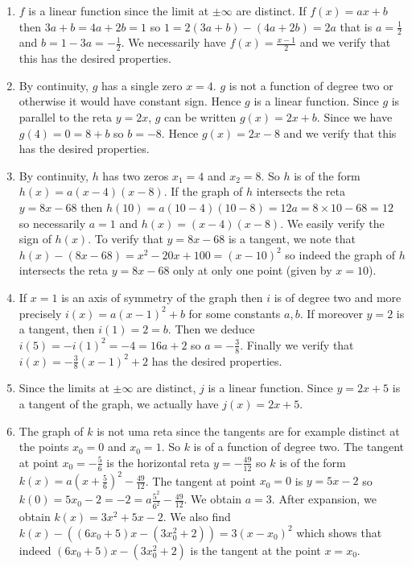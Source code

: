 \begin{enumerate}
\item $f$ is a linear function since the limit at $\pm\infty$ are distinct.
  If $f(x) = ax +b$ then $3a+b= 4a+2b = 1$
  so $1 = {2(3a+b)} - {(4a+2b)} = 2a$ that is $a = \frac{1}{2}$ and
  $b = 1 - 3a = -\frac{1}{2}$. We necessarily have $f(x) = \frac{x-1}{2}$
  and we verify that this has the desired properties.
\item By continuity, $g$ has a single zero $x = 4$. $g$ is not a function of
  degree two or otherwise it would have constant sign. Hence $g$ is a linear
  function. Since $g$ is parallel to the reta
  $y = 2x$, $g$ can be written $g(x) = 2x + b$. Since we have $g(4) = 0 =
  8 + b$ so $b = -8$. Hence $g(x) = 2x - 8$
  and we verify that this has the desired properties.
\item By continuity, $h$ has two zeros $x_1=4$ and $x_2=8$. So $h$ is of the
  form $h(x) = a {(x-4)} {(x-8)}$. If the graph of $h$
  intersects the reta $y = 8x - 68$
  then $h(10) = a {(10-4)} {(10-8)} = 12a = {8\times10-68} = 12$ so
  necessarily $a=1$ and $h(x) = {(x-4)} {(x-8)}$. We easily verify the sign
  of $h(x)$. To verify that $y = 8x - 68$ is a tangent, we note that
  $h(x) - {(8x - 68)} = x^2 - 20x +100 = {(x-10)}^2$ so indeed the graph
  of $h$ intersects the reta $y = 8x - 68$ only at only one point
  (given by $x=10$).
\item If $x = 1$ is an axis of symmetry of the graph then $i$ is of degree
  two and more precisely $i(x) = a {(x-1)}^2 + b$ for some constants $a,b$.
  If moreover $y = 2$ is a tangent, then $i(1) = 2 = b$.
  Then we deduce $i(5) = -{i(1)}^2 = -4 = 16a+2$ so $a = -\frac{3}{8}$.
  Finally we verify that $i(x) = -\frac{3}{8} {(x-1)}^2 + 2$ has the desired
  properties.
\item Since the limits at $\pm\infty$ are distinct, $j$ is a linear function.
  Since $y = 2x + 5$ is a tangent of the graph, we actually have
  $j(x) = 2x+5$.
\item The graph of $k$ is not uma reta since the tangents are for example
  distinct at the points $x_0=0$ and $x_0=1$.
  So $k$ is of a function of degree two.
  The tangent at point $x_0 = -\frac{5}{6}$ is the horizontal
  reta $y = -\frac{49}{12}$ so $k$ is of the form
  $k(x) = a\left(x+\frac{5}{6}\right)^2 -\frac{49}{12}$.
  The tangent at point $x_0 = 0$ is $y=5x-2$ so
  $k(0) = 5x_0-2 = -2 = a \frac{5^2}{6^2} -\frac{49}{12}$.
  We obtain $a = 3$. After expansion, we obtain
  $k(x) = 3x^2 + 5x -2$.
  We also find ${k(x)} - \left({(6x_0+5)}x-{(3x_0^2+2)}\right) = 3{(x-x_0)}^2$
  which shows that
  indeed ${(6x_0+5)}x-{(3x_0^2+2)}$ is the tangent at the point $x=x_0$.

\end{enumerate}

